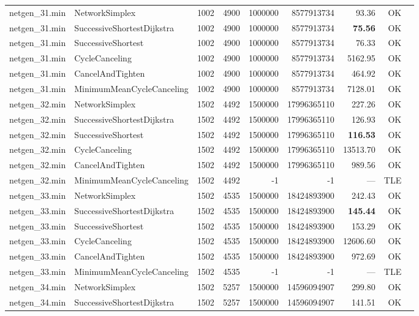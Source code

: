 \begin{longtable}{llrrrrrrl}
\midrule
netgen\_31.min & NetworkSimplex & 1002 & 4900 & 1000000 & 8577913734 & 93.36 & OK \\
netgen\_31.min & SuccessiveShortestDijkstra & 1002 & 4900 & 1000000 & 8577913734 & \textbf{75.56} & OK \\
netgen\_31.min & SuccessiveShortest & 1002 & 4900 & 1000000 & 8577913734 & 76.33 & OK \\
netgen\_31.min & CycleCanceling & 1002 & 4900 & 1000000 & 8577913734 & 5162.95 & OK \\
netgen\_31.min & CancelAndTighten & 1002 & 4900 & 1000000 & 8577913734 & 464.92 & OK \\
netgen\_31.min & MinimumMeanCycleCanceling & 1002 & 4900 & 1000000 & 8577913734 & 7128.01 & OK \\
\midrule
netgen\_32.min & NetworkSimplex & 1502 & 4492 & 1500000 & 17996365110 & 227.26 & OK \\
netgen\_32.min & SuccessiveShortestDijkstra & 1502 & 4492 & 1500000 & 17996365110 & 126.93 & OK \\
netgen\_32.min & SuccessiveShortest & 1502 & 4492 & 1500000 & 17996365110 & \textbf{116.53} & OK \\
netgen\_32.min & CycleCanceling & 1502 & 4492 & 1500000 & 17996365110 & 13513.70 & OK \\
netgen\_32.min & CancelAndTighten & 1502 & 4492 & 1500000 & 17996365110 & 989.56 & OK \\
netgen\_32.min & MinimumMeanCycleCanceling & 1502 & 4492 & -1 & -1 & --- & TLE \\
\midrule
netgen\_33.min & NetworkSimplex & 1502 & 4535 & 1500000 & 18424893900 & 242.43 & OK \\
netgen\_33.min & SuccessiveShortestDijkstra & 1502 & 4535 & 1500000 & 18424893900 & \textbf{145.44} & OK \\
netgen\_33.min & SuccessiveShortest & 1502 & 4535 & 1500000 & 18424893900 & 153.29 & OK \\
netgen\_33.min & CycleCanceling & 1502 & 4535 & 1500000 & 18424893900 & 12606.60 & OK \\
netgen\_33.min & CancelAndTighten & 1502 & 4535 & 1500000 & 18424893900 & 972.69 & OK \\
netgen\_33.min & MinimumMeanCycleCanceling & 1502 & 4535 & -1 & -1 & --- & TLE \\
\midrule
netgen\_34.min & NetworkSimplex & 1502 & 5257 & 1500000 & 14596094907 & 299.80 & OK \\
netgen\_34.min & SuccessiveShortestDijkstra & 1502 & 5257 & 1500000 & 14596094907 & 141.51 & OK \\

\end{longtable}
